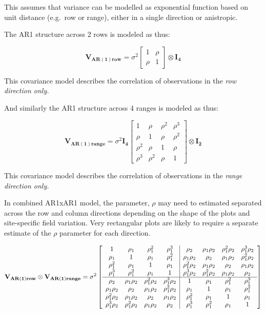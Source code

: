 \documentclass[
]{book}
\begin{document}
This assumes that variance can be modelled as exponential function based on unit distance (e.g.~row or range), either in a single direction or anistropic.

The AR1 structure across 2 rows is modeled as thus:

\[\mathbf { V_{AR(1)row}}  = \sigma^2
\left[ {\begin{array}{cc} 
1 & \rho \\
\rho & 1 
\end{array} } \right] \otimes \mathbf{I_4}\]

This covariance model describes the correlation of observations in the \emph{row direction only.}

And similarly the AR1 structure across 4 ranges is modeled as thus:

\[ \mathbf {V_{AR(1)range}} = \sigma^2 \mathbf{I_4} 
\left[ {\begin{array}{cccc} 
1 & \rho & \rho^2 & \rho^3 \\
\rho & 1 & \rho & \rho^2  \\
\rho^2 & \rho & 1 & \rho  \\
\rho^3 & \rho^2 & \rho & 1
\end{array} } \right] \otimes \mathbf{I_2} \]

This covariance model describes the correlation of observations in the \emph{range direction only.}

In combined AR1xAR1 model, the parameter, \(\rho\) may need to estimated separated across the row and column directions depending on the shape of the plots and site-specific field variation. Very rectangular plots are likely to require a separate estimate of the \(\rho\) parameter for each direction.

\begin{equation}
\mathbf {V_{AR(1)row} \otimes V_{AR(1)range}} = \sigma^2
\left[ {\begin{array}{cccc | cccc} 

1 & \rho_1 & \rho_1^2 & \rho_1^3 & \rho_2 & \rho_1\rho_2 & \rho_1^2\rho_2 & \rho_1^3\rho_2 \\
\rho_1 & 1 & \rho_1 & \rho_1^2 & \rho_1\rho_2 & \rho_2 & \rho_1\rho_2 & \rho_1^2\rho_2\\
\rho_1^2 & \rho_1 & 1 & \rho_1 & \rho_1^2\rho_2 & \rho_1\rho_2 & \rho_2 & \rho_1\rho_2\\
\rho_1^3 & \rho_1^2 & \rho_1 & 1 & \rho_1^3\rho_2 & \rho_1^2\rho_2 & \rho_1\rho_2 & \rho_2 \\
\hline
\rho_2 & \rho_1\rho_2 & \rho_1^2\rho_2 & \rho_1^3\rho_2 & 1 & \rho_1 & \rho_1^2 & \rho_1^3 \\
\rho_1\rho_2 & \rho_2 & \rho_1\rho_2 & \rho_1^2\rho_2 & \rho_1 & 1 & \rho_1 & \rho_1^2 \\
\rho_1^2\rho_2 & \rho_1\rho_2 & \rho_2 & \rho_1\rho_2 & \rho_1^2 & \rho_1 & 1 & \rho_1 \\
\rho_1^3\rho_2 & \rho_1^2\rho_2 & \rho_1\rho_2 & \rho_2 &\rho_1^3 & \rho_1^2 & \rho_1 & 1 \\

\end{array} } \right]
\end{equation}
\end{document}
